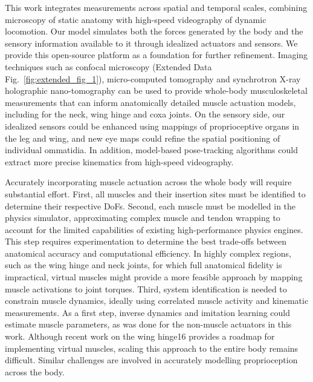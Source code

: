 \documentclass[sn-mathphys-num]{sn-jnl}%
\theoremstyle{thmstyleone}%
\theoremstyle{thmstyletwo}%
\theoremstyle{thmstylethree}%
\begin{document}
This work integrates measurements across spatial and temporal scales, combining microscopy of static anatomy with high-speed videography of dynamic locomotion. 
Our model simulates both the forces generated by the body and the sensory information available to it through idealized actuators and sensors. 
We provide this open-source platform as a foundation for further refinement. 
Imaging techniques such as confocal microscopy (Extended Data Fig.~\ref{fig:extended_fig_1}), micro-computed tomography\cite{lobato2022neuromechfly} and synchrotron X-ray holographic nano-tomography\cite{kuan2020dense} can be used to provide whole-body musculoskeletal measurements that can inform anatomically detailed muscle actuation models, including for the neck\cite{gorko2024motor}, wing hinge\cite{melis2024machine} and coxa\cite{kuan2020dense,mamiya2023biomechanical} joints. 
On the sensory side, our idealized sensors could be enhanced using mappings of proprioceptive organs in the leg and wing\cite{kuan2020dense,mamiya2023biomechanical}, and new eye maps could refine the spatial positioning of individual ommatidia\cite{zhao2025eye}. 
In addition, model-based pose-tracking algorithms could extract more precise kinematics from high-speed videography\cite{bolanos2021three,plum2023replicant}.



Accurately incorporating muscle actuation across the whole body will require substantial effort. 
First, all muscles and their insertion sites must be identified to determine their respective DoFs. 
Second, each muscle must be modelled in the physics simulator, approximating complex muscle and tendon wrapping to account for the limited capabilities of existing high-performance physics engines\cite{todorov2012mujoco,makoviychuk2021isaac}. 
This step requires experimentation to determine the best trade-offs between anatomical accuracy and computational efficiency. 
In highly complex regions, such as the wing hinge and neck joints, for which full anatomical fidelity is impractical, virtual muscles might provide a more feasible approach by mapping muscle activations to joint torques. 
Third, system identification is needed to constrain muscle dynamics, ideally using correlated muscle activity and kinematic measurements\cite{melis2024machine}. 
As a first step, inverse dynamics and imitation learning could estimate muscle parameters, as was done for the non-muscle actuators in this work. 
Although recent work on the wing hinge16 provides a roadmap for implementing virtual muscles, scaling this approach to the entire body remains difficult. 
Similar challenges are involved in accurately modelling proprioception across the body.
\end{document}
